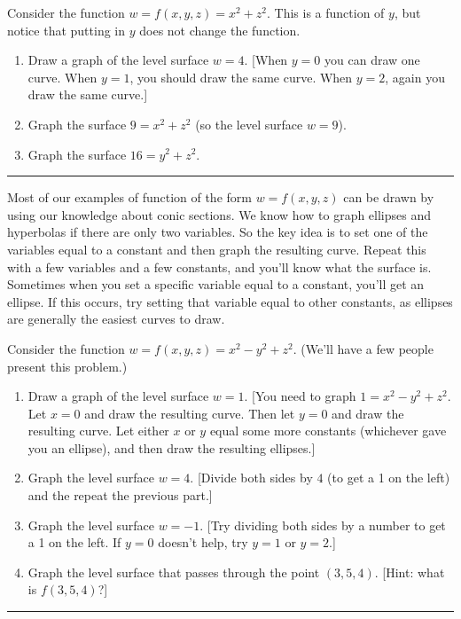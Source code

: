 \begin{problem}
 Consider the function $w=f(x,y,z)=x^2+z^2$. This is a function of $y$, but notice that putting in $y$ does not change the function. 
 \begin{enumerate}
  \item Draw a graph of the level surface $w=4$. [When $y=0$ you can draw one curve.  When $y=1$, you should draw the same curve.  When $y=2$, again you draw the same curve.]
  \item Graph the surface $9=x^2+z^2$ (so the level surface $w=9$).
  \item Graph the surface $16=y^2+z^2$.
 \end{enumerate}
\hrule\end{problem}

Most of our examples of function of the form $w=f(x,y,z)$ can be drawn by using our knowledge about conic sections. We know how to graph ellipses and hyperbolas if there are only two variables. So the key idea is to set one of the variables equal to a constant and then graph the resulting curve.  Repeat this with a few variables and a few constants, and you'll know what the surface is. Sometimes when you set a specific variable equal to a constant, you'll get an ellipse. If this occurs, try setting that variable equal to other constants, as ellipses are generally the easiest curves to draw.

\begin{problem}%
 Consider the function $w=f(x,y,z)=x^2-y^2+z^2$. (We'll have a few people present this problem.)
 \begin{enumerate}
  \item Draw a graph of the level surface $w=1$. [You need to graph $1=x^2-y^2+z^2$. Let $x=0$ and draw the resulting curve. Then let $y=0$ and draw the resulting curve. Let either $x$ or $y$ equal some more constants (whichever gave you an ellipse), and then draw the resulting ellipses.]  
  \item Graph the level surface $w=4$. [Divide both sides by $4$ (to get a 1 on the left) and the repeat the previous part.]
  \item Graph the level surface $w=-1$. [Try dividing both sides by a number to get a 1 on the left. If $y=0$ doesn't help, try $y=1$ or $y=2$.]
  \item Graph the level surface that passes through the point $(3,5,4)$. [Hint: what is $f(3,5,4)$?]
 \end{enumerate}
\hrule\end{problem}


